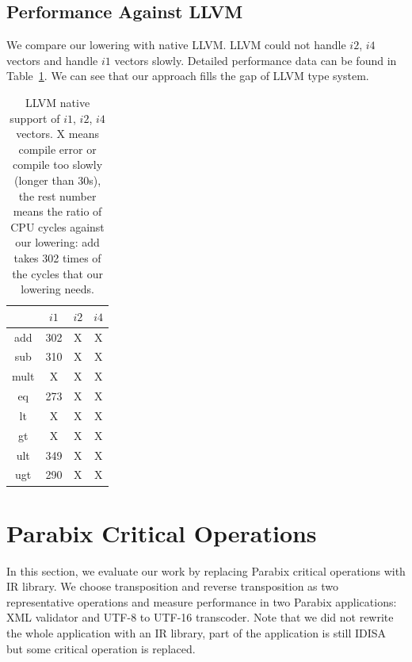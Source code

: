 \subsection{Performance Against LLVM}
We compare our lowering with native LLVM\@. LLVM could not handle $i2$, $i4$ vectors and handle $i1$ vectors slowly. Detailed performance data can be found in Table~\ref{table:vector_perf_LLVM}. We can see that our approach fills the gap of LLVM type system.

\begin{table}[h]
\centering
\begin{tabular}{|c|c|c|c|}
\hline
     & $i1$ & $i2$ & $i4$ \\ \hline
add  & 302  & X    & X    \\ \hline
sub  & 310  & X    & X    \\ \hline
mult & X    & X    & X    \\ \hline
eq   & 273  & X    & X    \\ \hline
lt   & X    & X    & X    \\ \hline
gt   & X    & X    & X    \\ \hline
ult  & 349  & X    & X    \\ \hline
ugt  & 290  & X    & X    \\ \hline
\end{tabular}
\caption[LLVM Native Support for $i1$, $i2$, $i4$ Vectors]{LLVM native support of $i1$, $i2$, $i4$ vectors. X means compile error or compile too slowly (longer than 30s), the rest number means the ratio of CPU cycles against our lowering: add takes 302 times of the cycles that our lowering needs.}
\label{table:vector_perf_LLVM}
\end{table}

\section{Parabix Critical Operations}
In this section, we evaluate our work by replacing Parabix critical operations with IR library. We choose transposition and reverse transposition as two representative operations and measure performance in two Parabix applications: XML validator and UTF-8 to UTF-16 transcoder. Note that we did not rewrite the whole application with an IR library, part of the application is still IDISA but some critical operation is replaced.

